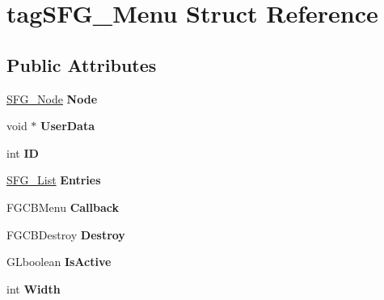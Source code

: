 \hypertarget{structtag_s_f_g___menu}{}\section{tag\+S\+F\+G\+\_\+\+Menu Struct Reference}
\label{structtag_s_f_g___menu}
\subsection*{Public Attributes}
\begin{DoxyCompactItemize}
\item 
\hyperlink{structtag_s_f_g___node}{S\+F\+G\+\_\+\+Node} {\bfseries Node}\hypertarget{structtag_s_f_g___menu_ae350b9c5639a605e292a5cca57f89c5b}{}\label{structtag_s_f_g___menu_ae350b9c5639a605e292a5cca57f89c5b}

\item 
void $\ast$ {\bfseries User\+Data}\hypertarget{structtag_s_f_g___menu_a84f7b0fda1e3221cf320fecb30676fc7}{}\label{structtag_s_f_g___menu_a84f7b0fda1e3221cf320fecb30676fc7}

\item 
int {\bfseries ID}\hypertarget{structtag_s_f_g___menu_ae393dd53a1dbc222785a84e6df269612}{}\label{structtag_s_f_g___menu_ae393dd53a1dbc222785a84e6df269612}

\item 
\hyperlink{structtag_s_f_g___list}{S\+F\+G\+\_\+\+List} {\bfseries Entries}\hypertarget{structtag_s_f_g___menu_a5fda89a85780d62e522bfa2e3167c22c}{}\label{structtag_s_f_g___menu_a5fda89a85780d62e522bfa2e3167c22c}

\item 
F\+G\+C\+B\+Menu {\bfseries Callback}\hypertarget{structtag_s_f_g___menu_a3fac68e24afab540483df694e7d5cea9}{}\label{structtag_s_f_g___menu_a3fac68e24afab540483df694e7d5cea9}

\item 
F\+G\+C\+B\+Destroy {\bfseries Destroy}\hypertarget{structtag_s_f_g___menu_ab421a820ebf9f7bdbbd22abe8e1a9aec}{}\label{structtag_s_f_g___menu_ab421a820ebf9f7bdbbd22abe8e1a9aec}

\item 
G\+Lboolean {\bfseries Is\+Active}\hypertarget{structtag_s_f_g___menu_a87cd03ad984d40be1f5afe86a28afb07}{}\label{structtag_s_f_g___menu_a87cd03ad984d40be1f5afe86a28afb07}

\item 
int {\bfseries Width}\hypertarget{structtag_s_f_g___menu_a8a0f656e2b2d8ccccbc52b334ce19132}{}\label{structtag_s_f_g___menu_a8a0f656e2b2d8ccccbc52b334ce19132}


\end{DoxyCompactItemize}
